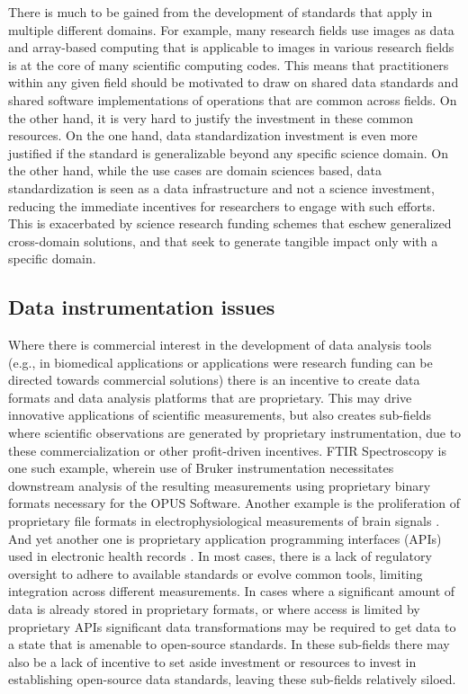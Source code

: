 \documentclass[
  number]{elsarticle}
\begin{document}
There is much to be gained from the development of standards that apply
in multiple different domains. For example, many research fields use
images as data and array-based computing that is applicable to images in
various research fields is at the core of many scientific computing
codes. This means that practitioners within any given field should be
motivated to draw on shared data standards and shared software
implementations of operations that are common across fields. On the
other hand, it is very hard to justify the investment in these common
resources. On the one hand, data standardization investment is even more
justified if the standard is generalizable beyond any specific science
domain. On the other hand, while the use cases are domain sciences
based, data standardization is seen as a data infrastructure and not a
science investment, reducing the immediate incentives for researchers to
engage with such efforts. This is exacerbated by science research
funding schemes that eschew generalized cross-domain solutions, and that
seek to generate tangible impact only with a specific domain.

\subsection{Data instrumentation
issues}\label{data-instrumentation-issues}

Where there is commercial interest in the development of data analysis
tools (e.g., in biomedical applications or applications were research
funding can be directed towards commercial solutions) there is an
incentive to create data formats and data analysis platforms that are
proprietary. This may drive innovative applications of scientific
measurements, but also creates sub-fields where scientific observations
are generated by proprietary instrumentation, due to these
commercialization or other profit-driven incentives. FTIR Spectroscopy
is one such example, wherein use of Bruker instrumentation necessitates
downstream analysis of the resulting measurements using proprietary
binary formats necessary for the OPUS Software. Another example is the
proliferation of proprietary file formats in electrophysiological
measurements of brain signals \citep[@Hermes2023-aw]{Gillon2024-vu}. And
yet another one is proprietary application programming interfaces (APIs)
used in electronic health records
\citep[@Adler-Milstein2017-id]{Barker2024-ox}. In most cases, there is a
lack of regulatory oversight to adhere to available standards or evolve
common tools, limiting integration across different measurements. In
cases where a significant amount of data is already stored in
proprietary formats, or where access is limited by proprietary APIs
significant data transformations may be required to get data to a state
that is amenable to open-source standards. In these sub-fields there may
also be a lack of incentive to set aside investment or resources to
invest in establishing open-source data standards, leaving these
sub-fields relatively siloed.
\end{document}
